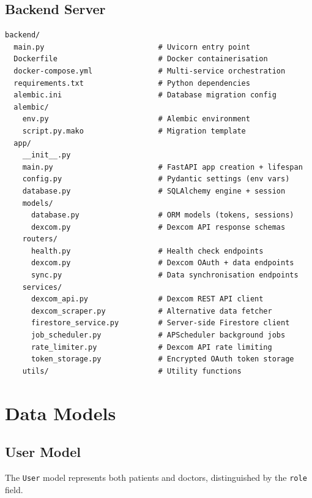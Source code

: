 \documentclass[12pt,a4paper]{article}
\begin{document}
\subsection{Backend Server}

\begin{lstlisting}[style=yamlstyle, title={backend/ directory structure}]
backend/
  main.py                          # Uvicorn entry point
  Dockerfile                       # Docker containerisation
  docker-compose.yml               # Multi-service orchestration
  requirements.txt                 # Python dependencies
  alembic.ini                      # Database migration config
  alembic/
    env.py                         # Alembic environment
    script.py.mako                 # Migration template
  app/
    __init__.py
    main.py                        # FastAPI app creation + lifespan
    config.py                      # Pydantic settings (env vars)
    database.py                    # SQLAlchemy engine + session
    models/
      database.py                  # ORM models (tokens, sessions)
      dexcom.py                    # Dexcom API response schemas
    routers/
      health.py                    # Health check endpoints
      dexcom.py                    # Dexcom OAuth + data endpoints
      sync.py                      # Data synchronisation endpoints
    services/
      dexcom_api.py                # Dexcom REST API client
      dexcom_scraper.py            # Alternative data fetcher
      firestore_service.py         # Server-side Firestore client
      job_scheduler.py             # APScheduler background jobs
      rate_limiter.py              # Dexcom API rate limiting
      token_storage.py             # Encrypted OAuth token storage
    utils/                         # Utility functions
\end{lstlisting}

\section{Data Models}

\subsection{User Model}

The \texttt{User} model represents both patients and doctors, distinguished by the \texttt{role} field.
\end{document}
